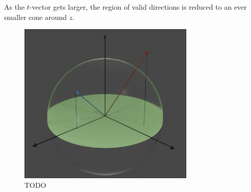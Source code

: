 As the \(t\)-vector gets larger, the region of valid directions is reduced to an ever smaller cone around \(z\).
\begin{figure}[ht]
  \centering
  \includegraphics[width=0.75\textwidth]{figures/tiltSpherewBackground.png}
  \caption{\label{fig:tiltSphere} TODO}
\end{figure}

